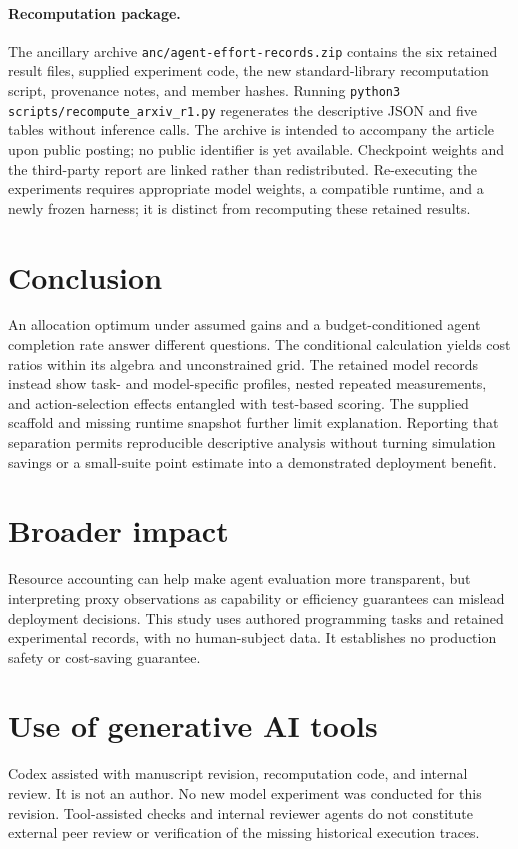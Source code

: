 \documentclass[11pt]{article}
\begin{document}
\paragraph{Recomputation package.}
The ancillary archive \texttt{anc/agent-effort-records.zip} contains the six retained result files, supplied experiment code, the new standard-library recomputation script, provenance notes, and member hashes. Running \texttt{python3 scripts/recompute_arxiv_r1.py} regenerates the descriptive JSON and five tables without inference calls. The archive is intended to accompany the article upon public posting; no public identifier is yet available. Checkpoint weights and the third-party report are linked rather than redistributed. Re-executing the experiments requires appropriate model weights, a compatible runtime, and a newly frozen harness; it is distinct from recomputing these retained results.

\section{Conclusion}
An allocation optimum under assumed gains and a budget-conditioned agent completion rate answer different questions. The conditional calculation yields cost ratios within its algebra and unconstrained grid. The retained model records instead show task- and model-specific profiles, nested repeated measurements, and action-selection effects entangled with test-based scoring. The supplied scaffold and missing runtime snapshot further limit explanation. Reporting that separation permits reproducible descriptive analysis without turning simulation savings or a small-suite point estimate into a demonstrated deployment benefit.

\section*{Broader impact}
Resource accounting can help make agent evaluation more transparent, but interpreting proxy observations as capability or efficiency guarantees can mislead deployment decisions. This study uses authored programming tasks and retained experimental records, with no human-subject data. It establishes no production safety or cost-saving guarantee.

\section*{Use of generative AI tools}
Codex assisted with manuscript revision, recomputation code, and internal review. It is not an author. No new model experiment was conducted for this revision. Tool-assisted checks and internal reviewer agents do not constitute external peer review or verification of the missing historical execution traces.
\end{document}
